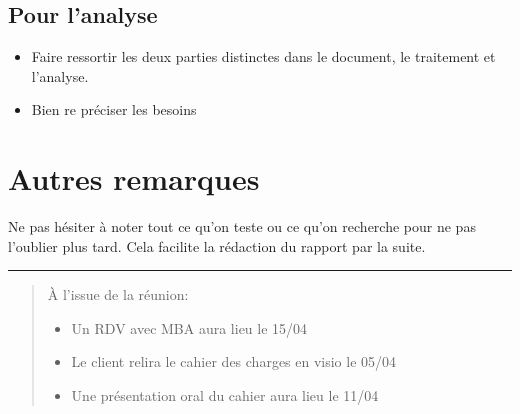 \documentclass[a4paper, 11pt]{article}
\begin{document}
\subsection{Pour l'analyse}
\begin{itemize}
    \item Faire ressortir les deux parties distinctes dans le document, le traitement et l'analyse.
    \item Bien re préciser les besoins
\end{itemize}

\section{Autres remarques}
Ne pas hésiter à noter tout ce qu'on teste ou ce qu'on recherche pour ne pas l'oublier plus tard. Cela facilite la rédaction du rapport par la suite.

\noindent\rule{8cm}{0.4pt}
\begin{quotation}
    À l'issue de la réunion: 
    \begin{itemize}
        \item Un RDV avec MBA aura lieu le 15/04
        \item Le client relira le cahier des charges en visio le 05/04
        \item Une présentation oral du cahier aura lieu le 11/04
    \end{itemize}
\end{quotation}
\end{document}
